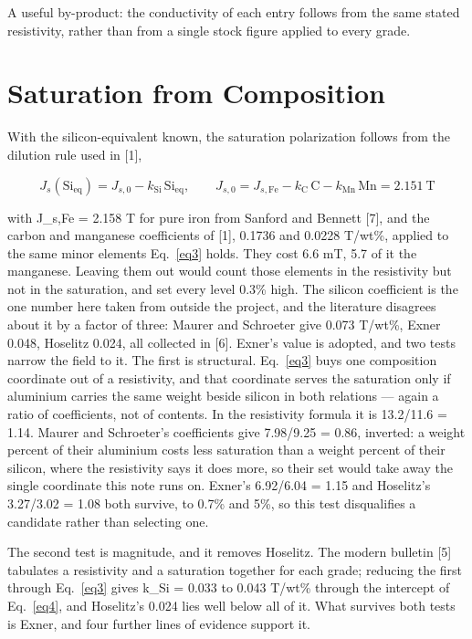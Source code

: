 \documentclass[
  11pt,
]{article}
\begin{document}
A useful by-product: the conductivity of each entry follows from the same stated resistivity, rather than from a single stock figure applied to every grade.

\section{Saturation from Composition}\label{saturation-from-composition}

With the silicon-equivalent known, the saturation polarization follows from the dilution rule used in {[}1{]},

\begin{equation}\label{eq4}
J_s(\mathrm{Si_{eq}}) = J_{s,0} - k_{\mathrm{Si}}\,\mathrm{Si_{eq}}, \qquad J_{s,0} = J_{s,\mathrm{Fe}} - k_{\mathrm{C}}\,\mathrm{C} - k_{\mathrm{Mn}}\,\mathrm{Mn} = 2.151\ \mathrm{T}
\end{equation}

with J\_s,Fe = 2.158 T for pure iron from Sanford and Bennett {[}7{]}, and the carbon and manganese coefficients of {[}1{]}, 0.1736 and 0.0228 T/wt\%, applied to the same minor elements Eq.~\eqref{eq3} holds. They cost 6.6 mT, 5.7 of it the manganese. Leaving them out would count those elements in the resistivity but not in the saturation, and set every level 0.3\% high. The silicon coefficient is the one number here taken from outside the project, and the literature disagrees about it by a factor of three: Maurer and Schroeter give 0.073 T/wt\%, Exner 0.048, Hoselitz 0.024, all collected in {[}6{]}. Exner's value is adopted, and two tests narrow the field to it. The first is structural. Eq.~\eqref{eq3} buys one composition coordinate out of a resistivity, and that coordinate serves the saturation only if aluminium carries the same weight beside silicon in both relations --- again a ratio of coefficients, not of contents. In the resistivity formula it is 13.2/11.6 = 1.14. Maurer and Schroeter's coefficients give 7.98/9.25 = 0.86, inverted: a weight percent of their aluminium costs less saturation than a weight percent of their silicon, where the resistivity says it does more, so their set would take away the single coordinate this note runs on. Exner's 6.92/6.04 = 1.15 and Hoselitz's 3.27/3.02 = 1.08 both survive, to 0.7\% and 5\%, so this test disqualifies a candidate rather than selecting one.

The second test is magnitude, and it removes Hoselitz. The modern bulletin {[}5{]} tabulates a resistivity and a saturation together for each grade; reducing the first through Eq.~\eqref{eq3} gives k\_Si = 0.033 to 0.043 T/wt\% through the intercept of Eq.~\eqref{eq4}, and Hoselitz's 0.024 lies well below all of it. What survives both tests is Exner, and four further lines of evidence support it.
\end{document}
